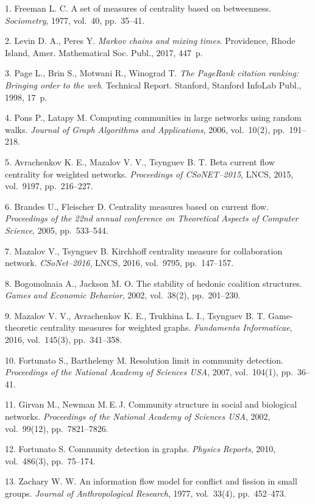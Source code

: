 \vskip 2mm

{\footnotesize

1. Freeman L. C. A set of measures of centrality based on
betweenness. \textit{Sociometry}, 1977, vol.~40, pp.~35--41.

2. Levin D. A., Peres Y. \textit{Markov chains and mixing times}.
Providence, Rhode Island, Amer. Mathematical Soc. Publ., 2017,
447~p.

3. Page L., Brin S., Motwani R., Winograd T. \textit{The PageRank
citation ranking: Bringing order to the web}. Technical Report.
Stanford, Stanford InfoLab Publ., 1998, 17~p.

4. Pons P., Latapy M. Computing communities in large networks
using random walks. \textit{Journal of Graph Algorithms and
Applications}, 2006, vol.~10(2), pp.~191--218.

5. Avrachenkov K. E., Mazalov V. V., Tsynguev B. T. Beta current
flow centrality for weighted networks. \textit{Proceedings of
CSoNET--2015}, LNCS, 2015, vol.~9197, pp.~216--227.

6. Brandes U., Fleischer D. Centrality measures based on current
flow. \textit{Proceedings of the 22nd annual conference on
Theoretical Aspects of Computer Science}, 2005, pp.~533--544.

7. Mazalov V., Tsynguev B. Kirchhoff centrality measure for
collaboration network. \textit{CSoNet--2016}, LNCS, 2016,
vol.~9795, pp.~147--157.

8. Bogomolnaia A., Jackson M. O. The stability of hedonic
coalition structures. \textit{Games and Economic Behavior}, 2002,
vol.~38(2), pp.~201--230.

9. Mazalov V. V., Avrachenkov K. E., Trukhina L. I., Tsynguev B.
T. Game-theoretic centrality measures for weighted graphs.
\textit{Fundamenta Informaticae}, 2016, vol.~145(3), pp.~341--358.

10. Fortunato S., Barthelemy M. Resolution limit in community
detection. \textit{Proceedings of the National Academy of Sciences
USA}, 2007, vol.~104(1), pp.~36--41.

11. Girvan M., Newman M.\,E.\,J. Community structure in social and
biological networks. \textit{Proceedings of the National Academy
of Sciences USA}, 2002, vol.~99(12), pp.~7821--7826.

12. Fortunato S. Community detection in graphs. \textit{Physics
Reports}, 2010, vol.~486(3), pp.~75--174.

13. Zachary W. W. An information flow model for conflict and
fission in small groups. \textit{Journal of Anthropological
Research}, 1977, vol.~33(4), pp.~452--473.

}
